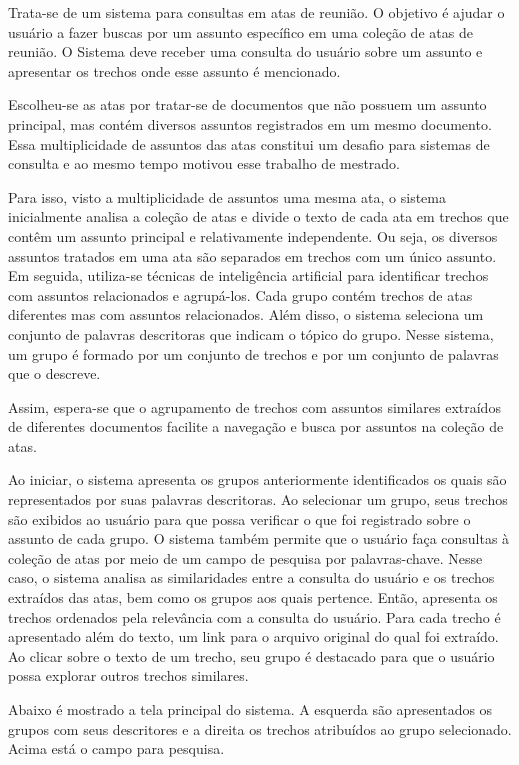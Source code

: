 Trata-se de um sistema para consultas em atas de reunião. O objetivo é ajudar o usuário a fazer buscas por um assunto específico em uma coleção de atas de reunião. O Sistema deve receber uma consulta do usuário sobre um assunto e apresentar os trechos onde esse assunto é mencionado. 

Escolheu-se as atas por tratar-se de documentos que não possuem um assunto principal, mas contém diversos assuntos registrados em um mesmo documento. Essa multiplicidade de assuntos das atas constitui um desafio para sistemas de consulta e ao mesmo tempo motivou esse trabalho de mestrado.

Para isso, visto a multiplicidade de assuntos uma mesma ata, o sistema inicialmente  analisa a coleção de atas e divide o texto de cada ata em trechos que contêm um assunto principal e relativamente independente. 
Ou seja, os diversos assuntos tratados em uma ata são separados em trechos com um único assunto.
Em seguida, utiliza-se técnicas de inteligência artificial para identificar trechos com assuntos relacionados e agrupá-los. Cada grupo contém trechos de atas diferentes mas com assuntos relacionados. Além disso, o sistema seleciona um conjunto de palavras descritoras que indicam o tópico do grupo. Nesse sistema, um grupo é formado por um conjunto de trechos e por um conjunto de palavras que o descreve.

Assim, espera-se que o agrupamento de trechos com assuntos similares extraídos de diferentes documentos facilite a navegação e busca por assuntos na coleção de atas.

Ao iniciar, o sistema apresenta os grupos anteriormente identificados os quais são representados por suas palavras descritoras. Ao selecionar um grupo, seus trechos são exibidos ao usuário para que possa verificar o que foi registrado sobre o assunto de cada grupo. 
%
O sistema também permite que o usuário faça consultas à coleção de atas por meio de um campo de pesquisa por palavras-chave. Nesse caso, o sistema  analisa as similaridades entre a consulta do usuário e os trechos extraídos das atas, bem como os grupos aos quais pertence. Então, apresenta os trechos ordenados pela relevância com a consulta do usuário. Para cada trecho é apresentado além do texto, um link para o arquivo original do qual foi extraído. Ao clicar sobre o texto de um trecho, seu grupo é destacado para que o usuário possa explorar outros trechos similares.


Abaixo é mostrado a tela principal do sistema. A esquerda são apresentados os grupos com seus descritores e a direita os trechos atribuídos ao grupo selecionado. Acima está o campo para pesquisa.



